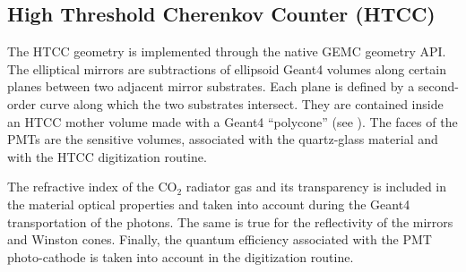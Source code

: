 \subsection{High Threshold Cherenkov Counter (HTCC)}

The HTCC geometry is implemented through the native GEMC geometry API. The elliptical mirrors are subtractions of
ellipsoid Geant4 volumes along certain planes between two adjacent mirror substrates. Each plane is defined by a
second-order curve along which the two substrates intersect. They are contained inside an HTCC mother volume made
with a Geant4 ``polycone'' (see ). The faces of the PMTs are the sensitive volumes, associated with the
quartz-glass material and with the HTCC digitization routine.

The refractive index of the CO$_2$ radiator gas and its transparency is included in the material optical properties and
taken into account during the Geant4 transportation of the photons. The same is true for the reflectivity of the mirrors
and Winston cones. Finally, the quantum efficiency associated with the PMT photo-cathode is taken into account in
the digitization routine.

